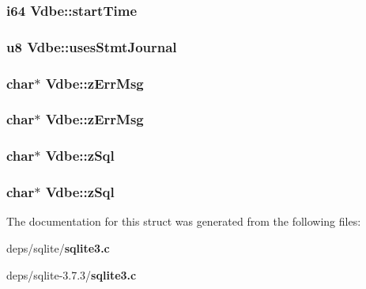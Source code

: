 \subsubsection{\setlength{\rightskip}{0pt plus 5cm}\bf{i64} \bf{Vdbe::start\-Time}}\label{structVdbe_b2f6f1d0f422e280c083dda941065532}


\subsubsection{\setlength{\rightskip}{0pt plus 5cm}\bf{u8} \bf{Vdbe::uses\-Stmt\-Journal}}\label{structVdbe_acc0172dfc2ab691c4d600dbb8c07852}


\subsubsection{\setlength{\rightskip}{0pt plus 5cm}char$\ast$ \bf{Vdbe::z\-Err\-Msg}}\label{structVdbe_ed0fa410c04fae75468e399fb71691b7}


\subsubsection{\setlength{\rightskip}{0pt plus 5cm}char$\ast$ \bf{Vdbe::z\-Err\-Msg}}\label{structVdbe_ed0fa410c04fae75468e399fb71691b7}


\subsubsection{\setlength{\rightskip}{0pt plus 5cm}char$\ast$ \bf{Vdbe::z\-Sql}}\label{structVdbe_080c22ed15b2bba65b3eb3cf8d186b54}


\subsubsection{\setlength{\rightskip}{0pt plus 5cm}char$\ast$ \bf{Vdbe::z\-Sql}}\label{structVdbe_080c22ed15b2bba65b3eb3cf8d186b54}




The documentation for this struct was generated from the following files:\begin{CompactItemize}
\item 
deps/sqlite/\bf{sqlite3.c}\item 
deps/sqlite-3.7.3/\bf{sqlite3.c}\end{CompactItemize}
